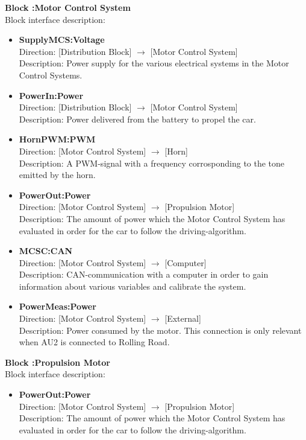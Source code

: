 \textbf{Block :Motor Control System}\\
Block interface description:
\begin{itemize}
	\item \textbf{SupplyMCS:Voltage}\\
	Direction: [Distribution Block] $\rightarrow$ [Motor Control System]\\
	Description: Power supply for the various electrical systems in the Motor Control Systems.
	\item \textbf{PowerIn:Power}\\
	Direction: [Distribution Block] $\rightarrow$ [Motor Control System]\\
	Description: Power delivered from the battery to propel the car.
	\item \textbf{HornPWM:PWM}\\
	Direction: [Motor Control System] $\rightarrow$ [Horn]\\
	Description: A PWM-signal with a frequency corrosponding to the tone emitted by the horn.
	\item \textbf{PowerOut:Power}\\
	Direction: [Motor Control System] $\rightarrow$ [Propulsion Motor]\\
	Description: The amount of power which the Motor Control System has evaluated in order for the car to follow the driving-algorithm.
	\item \textbf{MCSC:CAN}\\
	Direction: [Motor Control System] $\rightarrow$ [Computer]\\
	Description: CAN-communication with a computer in order to gain information about various variables and calibrate the system.
	\item \textbf{PowerMeas:Power}\\
	Direction: [Motor Control System] $\rightarrow$ [External]\\
	Description: Power consumed by the motor. This connection is only relevant when AU2 is connected to Rolling Road.
\end{itemize}

\textbf{Block :Propulsion Motor}\\
Block interface description:
\begin{itemize}
	\item \textbf{PowerOut:Power}\\
	Direction: [Motor Control System] $\rightarrow$ [Propulsion Motor]\\
	Description: The amount of power which the Motor Control System has evaluated in order for the car to follow the driving-algorithm.
\end{itemize}

